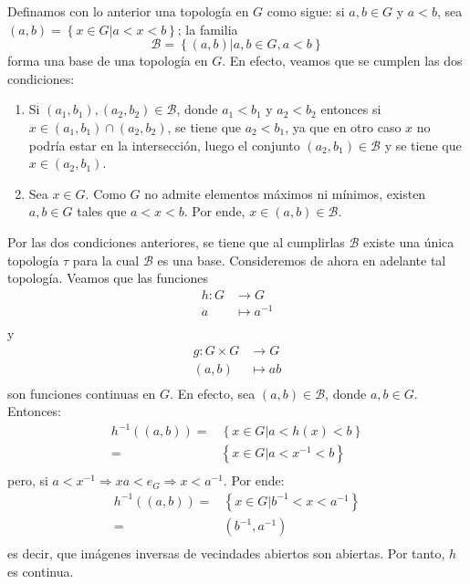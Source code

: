 \documentclass[12pt]{report}
\theoremstyle{largebreak}
\begin{document}
    Definamos con lo anterior una topología en $G$ como sigue: si $a,b\in G$ y $a<b$, sea $(a,b)=\left\{x\in G\big|a<x<b \right\}$; la familia
    \begin{equation*}
        \mathcal{B}=\left\{(a,b)\big| a,b\in G, a<b \right\}
    \end{equation*}
    forma una base de una topología en $G$. En efecto, veamos que se cumplen las dos condiciones:
    \begin{enumerate}
        \item Si $(a_1,b_1),(a_2,b_2)\in\mathcal{B}$, donde $a_1<b_1$ y $a_2<b_2$ entonces si $x\in(a_1,b_1)\cap(a_2,b_2)$, se tiene que $a_2<b_1$, ya que en otro caso $x$ no podría estar en la intersección, luego el conjunto $(a_2,b_1)\in\mathcal{B}$ y se tiene que $x\in(a_2,b_1)$.
        \item Sea $x\in G$. Como $G$ no admite elementos máximos ni mínimos, existen $a,b\in G$ tales que $a<x<b$. Por ende, $x\in(a,b)\in\mathcal{B}$.
    \end{enumerate}
    Por las dos condiciones anteriores, se tiene que al cumplirlas $\mathcal{B}$ existe una única topología $\tau$ para la cual $\mathcal{B}$ es una base. Consideremos de ahora en adelante tal topología. Veamos que las funciones
    \begin{equation*}
        \begin{split}
            h:G&\rightarrow G\\
            a&\mapsto a^{-1}\\
        \end{split}
    \end{equation*}
    y
    \begin{equation*}
        \begin{split}
            g:G\times G&\rightarrow G\\
            (a,b)&\mapsto ab\\
        \end{split}
    \end{equation*}
    son funciones continuas en $G$. En efecto, sea $(a,b)\in\mathcal{B}$, donde $a,b\in G$. Entonces:
    \begin{equation*}
        \begin{split}
            h^{-1}((a,b))=&\left\{x\in G\big| a<h(x)<b \right\}\\
            =&\left\{x\in G\big| a<x^{-1}<b \right\}\\
        \end{split}
    \end{equation*}
    pero, si $a<x^{-1}\Rightarrow xa<e_G\Rightarrow x<a^{-1}$. Por ende:
    \begin{equation*}
        \begin{split}
            h^{-1}((a,b))=&\left\{x\in G\big| b^{-1}<x<a^{-1} \right\}\\
            =&(b^{-1},a^{-1})\\
        \end{split}
    \end{equation*}
    es decir, que imágenes inversas de vecindades abiertos son abiertas. Por tanto, $h$ es continua.
\end{document}
